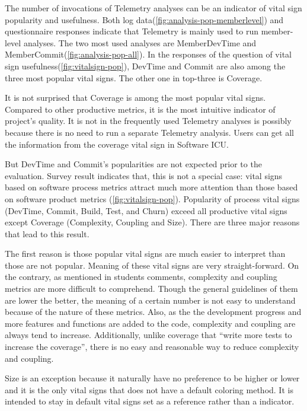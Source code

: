The number of invocations of Telemetry analyses can be an indicator of vital sign popularity and usefulness. Both log data(\autoref{fig:analysis-pop-memberlevel}) and questionnaire responses indicate that Telemetry is mainly used to run member-level analyses. The two most used analyses are MemberDevTime and MemberCommit(\autoref{fig:analysis-pop-all}). In the responses of the question of vital sign usefulness(\autoref{fig:vitalsign-pop}), DevTime and Commit are also among the three most popular vital signs. The other one in top-three is Coverage. 

It is not surprised that Coverage is among the most popular vital signs. Compared to other productive metrics, it is the most intuitive indicator of project's quality. It is not in the frequently used Telemetry analyses is possibly because there is no need to run a separate Telemetry analysis. Users can get all the information from the coverage vital sign in Software ICU.

But DevTime and Commit's popularities are not expected prior to the evaluation. Survey result indicates that, this is not a special case: vital signs based on software process metrics attract much more attention than those based on software product metrics (\autoref{fig:vitalsign-pop}). Popularity of process vital signs (DevTime, Commit, Build, Test, and Churn) exceed all productive vital signs except Coverage (Complexity, Coupling and Size). There are three major reasons that lead to this result. 

The first reason is those popular vital signs are much easier to interpret than those are not popular. Meaning of these vital signs are very straight-forward. On the contrary, as mentioned in students comments, complexity and coupling metrics are more difficult to comprehend. Though the general guidelines of them are lower the better, the meaning of a certain number is not easy to understand because of the nature of these metrics. Also, as the the development progress and more features and functions are added to the code, complexity and coupling are always tend to increase. Additionally, unlike coverage that ``write more tests to increase the coverage'', there is no easy and reasonable way to reduce complexity and coupling. 

Size is an exception because it naturally have no preference to be higher or lower and it is the only vital signs that does not have a default coloring method. It is intended to stay in default vital signs set as a reference rather than a indicator.

